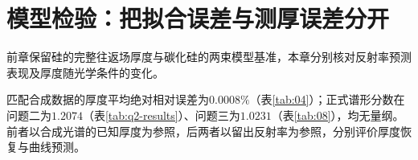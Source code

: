 \section{模型检验：把拟合误差与测厚误差分开}

前章保留硅的完整往返场厚度与碳化硅的两束模型基准，本章分别核对反射率预测表现及厚度随光学条件的变化。

匹配合成数据的厚度平均绝对相对误差为$0.0008\%$（表\ref{tab:04}）；正式谱形分数在问题二为$1.2074$（表\ref{tab:q2-results}）、问题三为$1.0231$（表\ref{tab:08}），均无量纲。前者以合成光谱的已知厚度为参照，后两者以留出反射率为参照，分别评价厚度恢复与曲线预测。

